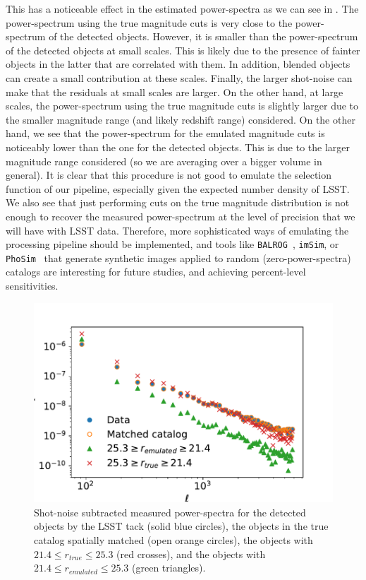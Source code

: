 \documentclass[\docopts]{\docclass}
\begin{document}
This has a noticeable effect in the estimated power-spectra as we can see in . The power-spectrum using the true magnitude cuts is very close to the  power-spectrum of the detected objects. However, it is smaller than the power-spectrum of the detected objects at small scales. This is likely due to the presence of fainter objects in the latter that are correlated with them. In addition, blended objects can create a small contribution at these scales. Finally, the larger shot-noise can make that the residuals at small scales are larger. On the other hand, at large scales, the power-spectrum using the true magnitude cuts is slightly larger due to the smaller magnitude range (and likely redshift range) considered. On the other hand, we see that the power-spectrum for the emulated magnitude cuts is noticeably lower than the one for the detected objects. This is due to the larger magnitude range considered (so we are averaging over a bigger volume in general). It is clear that this procedure is not good to emulate the selection function of our pipeline, especially given the expected number density of LSST. We also see that just performing cuts on the true magnitude distribution is not enough to recover the measured power-spectrum at the level of precision that we will have with LSST data. Therefore, more sophisticated ways of emulating the processing pipeline should be implemented, and tools like \texttt{BALROG}~\citep{2016MNRAS.457..786S}, \texttt{imSim}, or \texttt{PhoSim}~\citep{2015ApJS..218...14P} that generate synthetic images applied to random (zero-power-spectra) catalogs are interesting for future studies, and achieving percent-level sensitivities.
\begin{figure}
\centering
\includegraphics[width=0.9\columnwidth]{emulated_power_spectra}
\caption{Shot-noise subtracted measured power-spectra for the detected objects by the LSST tack (solid blue circles), the objects in the true catalog spatially matched (open orange circles), the objects with $21.4 \leq r_{true} \leq 25.3$ (red crosses), and the objects with $21.4 \leq r_{emulated} \leq 25.3$ (green triangles).}
\label{fig:emulated_power}
\end{figure}
\end{document}
